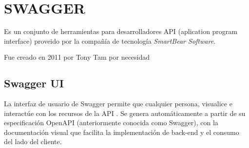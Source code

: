 \chapter*{SWAGGER}
Es un conjunto de herramientas para desarrolladores API (aplication program interface) proveido por la compañía de tecnología \textit{SmartBear Software}. 

Fue creado en 2011 por Tony Tam por necesidad
\section{Swagger UI}
La interfaz de usuario de Swagger permite que cualquier persona, visualice e interactúe con los recursos de la API . Se genera automáticamente a partir de su especificación OpenAPI (anteriormente conocida como Swagger), con la documentación visual que facilita la implementación de back-end y el consumo del lado del cliente.


    
